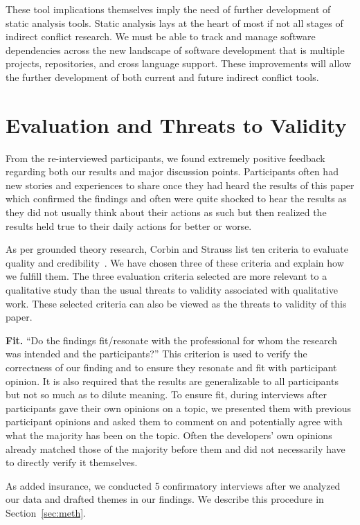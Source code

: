 \documentclass[conference]{IEEEtran}
\begin{document}
These tool implications themselves imply the need of further development of static analysis tools. Static
analysis lays at the heart of most if not all stages of indirect conflict research. We must be able to track and manage
software dependencies across the new landscape of software development that is multiple projects, repositories, and cross
language support. These improvements will allow the further development of both current and future indirect conflict
tools.

\section{Evaluation and Threats to Validity}
\label{sec:eval}

From the re-interviewed participants, we found extremely positive feedback regarding both our results and major discussion
points. Participants often had new stories and experiences to share once they had heard the results of this paper which
confirmed the findings and often were quite shocked to hear the results as they did not usually think about their actions
as such but then realized the results held true to their daily actions for better or worse.

As per grounded theory research, Corbin and Strauss list ten criteria to evaluate quality and credibility~\cite{Corbin:1998:SP}.
We have chosen three of these criteria and explain how we fulfill them. The three evaluation criteria selected are more relevant
to a qualitative study than the usual threats to validity associated with qualitative work. These selected criteria can also
be viewed as the threats to validity of this paper.

{\bfseries Fit.} ``Do the findings fit/resonate with the professional for whom the research was intended and the participants?'' This
criterion is used to verify the correctness of our finding and to ensure they resonate and fit with participant opinion. It is also
required that the results are generalizable to all participants but not so much as to dilute meaning. To ensure fit, during interviews
after participants gave their own opinions on a topic, we presented them with previous participant opinions and asked them to comment
on and potentially agree with what the majority has been on the topic. Often the developers' own opinions already matched those of
the majority before them and did not necessarily have to directly verify it themselves.

As added insurance, we conducted 5 confirmatory interviews after we analyzed our data and drafted themes in our findings. We describe this
procedure in Section~\ref{sec:meth}.
\end{document}
